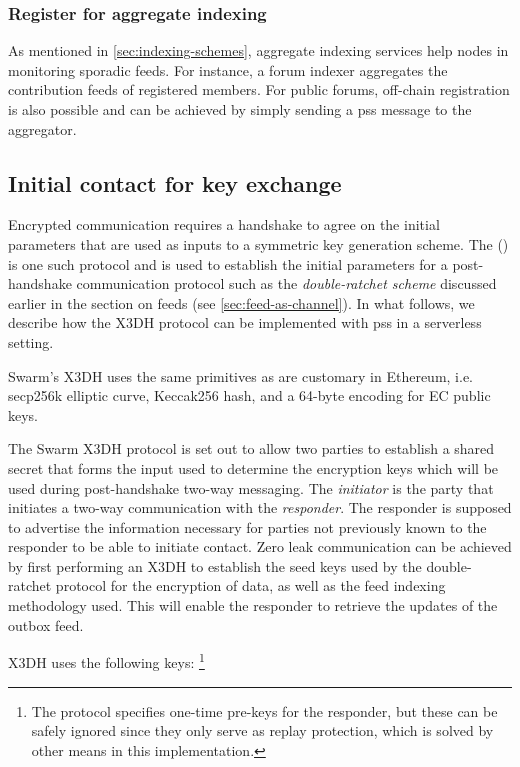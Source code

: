 \subsubsection{Register for aggregate indexing}

As mentioned in \ref{sec:indexing-schemes}, aggregate indexing services help nodes in monitoring sporadic feeds. For instance, a forum indexer aggregates the contribution feeds of registered members. For public forums, off-chain registration is also possible and can be achieved by simply sending a pss message to the aggregator. 


\subsection{Initial contact for key exchange\statusgreen}\label{sec:pss-key-exchange}


Encrypted communication requires a handshake to agree on the initial parameters that are used as inputs to a symmetric key generation scheme. The  () is one such protocol \cite{marlinspike2016x3dh} and is used to establish the initial parameters for a post-handshake communication protocol such as the \emph{double-ratchet scheme} discussed earlier in the section on feeds (see \ref{sec:feed-as-channel}). 
In what follows, we describe how the X3DH protocol can be implemented with pss in a serverless setting. 

Swarm's X3DH uses the same primitives as are customary in Ethereum, i.e. secp256k elliptic curve, Keccak256 hash, and a 64-byte encoding for EC public keys. 

The Swarm X3DH protocol is set out to allow two parties to establish a shared secret that forms the input used to determine the encryption keys which will be used during post-handshake two-way messaging. The \emph{initiator} is the party that initiates a two-way communication with the \emph{responder}. The responder is supposed to advertise the information necessary for parties not previously known to the responder to be able to initiate contact. Zero leak communication can be achieved by first performing an X3DH to establish the seed keys used by the double-ratchet protocol for the encryption of data, as well as the feed indexing methodology used. This will enable the responder to retrieve the updates of the outbox feed.

X3DH uses the following keys:%
%
\footnote{The protocol specifies one-time pre-keys for the responder, but these can be safely ignored since they only serve as replay protection, which is solved by other means in this implementation.}

